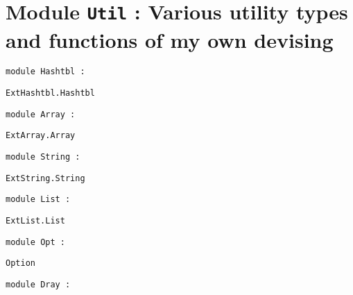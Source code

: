 \documentclass[11pt]{article}
\begin{document}
\tableofcontents
\section{Module {\tt{Util}} : Various utility types and functions of my own devising}
\label{module:Util}




\ocamldocvspace{0.5cm}



\begin{ocamldoccode}
{\tt{module }}{\tt{Hashtbl}}{\tt{ : }}\end{ocamldoccode}
\label{module:Util.Hashtbl}

{\tt{ExtHashtbl.Hashtbl}}





\begin{ocamldoccode}
{\tt{module }}{\tt{Array}}{\tt{ : }}\end{ocamldoccode}
\label{module:Util.Array}

{\tt{ExtArray.Array}}





\begin{ocamldoccode}
{\tt{module }}{\tt{String}}{\tt{ : }}\end{ocamldoccode}
\label{module:Util.String}

{\tt{ExtString.String}}





\begin{ocamldoccode}
{\tt{module }}{\tt{List}}{\tt{ : }}\end{ocamldoccode}
\label{module:Util.List}

{\tt{ExtList.List}}





\begin{ocamldoccode}
{\tt{module }}{\tt{Opt}}{\tt{ : }}\end{ocamldoccode}
\label{module:Util.Opt}

{\tt{Option}}





\begin{ocamldoccode}
{\tt{module }}{\tt{Dray}}{\tt{ : }}\end{ocamldoccode}
\label{module:Util.Dray}
\end{document}
